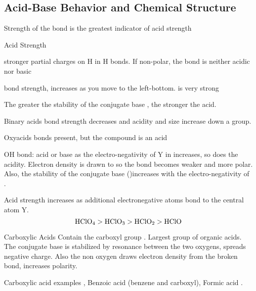 \begin{mdframed}
\begin{multicols}{2}

\subsection{Acid-Base Behavior and Chemical Structure}
\begin{compactdesc}
    \item[Strength of the \ce{H-A}] bond is the greatest indicator of
        acid strength
    \item[Acid Strength]
        \begin{compactenum}
        \item stronger partial charges on H in H bonds. If non-polar, the bond
            is neither acidic nor basic
        \item bond strength, increases as you move to the left-bottom.
             is very strong
        \item The greater the stability of the conjugate base , the
            stronger the acid.
        \end{compactenum}
    \item[Binary acids] bond strength decreases and acidity and size increase
        down a group.
    \item[Oxyacids]  bonds present, but the compound is an acid
    \item[OH bond: acid or base] as the electro-negativity of Y in 
        increases, so does the acidity. Electron density is drawn to 
        so the  bond becomes weaker and more polar. Also, the stability
        of the conjugate base ()increases with the electro-negativity
        of .
    \item[Acid strength increases] as additional electronegative atoms bond to
        the central atom Y. \[
        \ce{HClO4}
        >
        \ce{HClO3}
        >
        \ce{HClO2}
        >
        \ce{HClO}
        \]
    \item[Carboxylic Acids]
        Contain the carboxyl group  .
        Largest group of organic acids. The conjugate base is stabilized
        by resonance between the two oxygens, spreads negative charge. Also the
        non  oxygen draws electron density from the broken bond,
        increases polarity.
    \item[Carboxylic acid examples] , Benzoic acid
        (benzene and carboxyl), Formic acid .
\end{compactdesc}
\end{multicols}
\end{mdframed}



